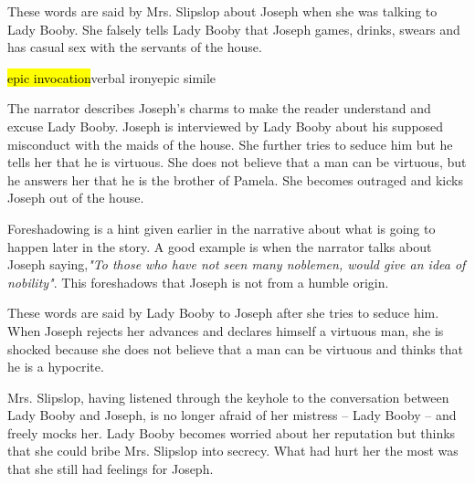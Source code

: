 \documentclass[12pt, a4paper]{article}
\begin{document}


These words are said by Mrs. Slipslop about Joseph when she was talking to Lady Booby.
She falsely tells Lady Booby that Joseph games, drinks, swears and has casual sex
with the servants of the house. 

{\hl{epic invocation}}{verbal irony}{epic simile}



\ind The narrator describes Joseph's charms to make the 
reader understand and excuse Lady Booby. Joseph is interviewed by Lady Booby about his 
supposed misconduct with the maids of the house.
She further tries to seduce him but he tells her that he is virtuous. She does not believe that
a man can be virtuous, but he answers her that he is the brother of Pamela. She becomes outraged and
kicks Joseph out of the house. 


\ind Foreshadowing is a hint given earlier in the narrative 
about what is going to happen later in the story. A good example
is when the narrator talks about Joseph saying,\textit{"To those who have not
seen many noblemen, would give an idea of nobility"}. This foreshadows that
Joseph is not from a humble origin.



These words are said by Lady Booby to Joseph after she tries to seduce him. When Joseph
rejects her advances and declares himself a virtuous man, she is shocked because
she does not believe that a man can be virtuous and thinks that he is a hypocrite.


\ind Mrs. Slipslop, having listened through the keyhole to the conversation between 
Lady Booby and Joseph, is no longer afraid of her mistress -- Lady Booby -- and freely mocks her.
Lady Booby becomes worried about her reputation but thinks that she could bribe Mrs. Slipslop
into secrecy. What had hurt her the most was that she still had feelings for Joseph. 
\end{document}
